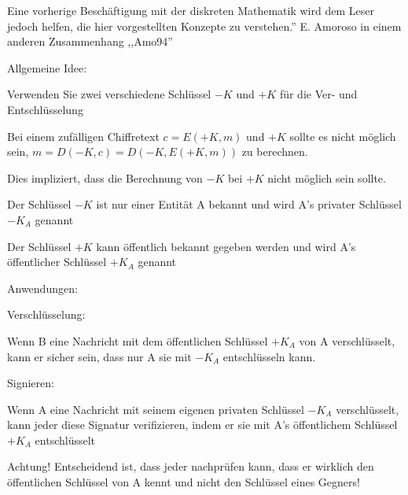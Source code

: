 \documentclass[a4paper]{article}
\begin{document}
\begin{multicols}{3}
      Eine vorherige Beschäftigung mit der diskreten Mathematik wird dem Leser
      jedoch helfen, die hier vorgestellten Konzepte zu verstehen.'' E.
      Amoroso in einem anderen Zusammenhang ,,Amo94''

      \begin{itemize*}
            \item Allgemeine Idee:
            \begin{itemize*}
                  \item Verwenden Sie zwei verschiedene Schlüssel $-K$ und $+K$ für die Ver- und Entschlüsselung
                  \item Bei einem zufälligen Chiffretext $c=E(+K, m)$ und $+K$ sollte es nicht möglich sein, $m = D(-K, c) = D(-K, E(+K, m))$ zu berechnen.
                  \begin{itemize*} \item Dies impliziert, dass die Berechnung von $-K$ bei $+K$ nicht möglich sein sollte. \end{itemize*}
                  \item Der Schlüssel $-K$ ist nur einer Entität A bekannt und wird A's privater Schlüssel $-K_A$ genannt
                  \item Der Schlüssel $+K$ kann öffentlich bekannt gegeben werden und wird A's öffentlicher Schlüssel $+K_A$ genannt
            \end{itemize*}
            \item Anwendungen:
            \begin{itemize*}
                  \item Verschlüsselung:
                  \begin{itemize*} \item Wenn B eine Nachricht mit dem öffentlichen Schlüssel $+K_A$ von A verschlüsselt, kann er sicher sein, dass nur A sie mit $-K_A$ entschlüsseln kann. \end{itemize*}
                  \item Signieren:
                  \begin{itemize*} \item Wenn A eine Nachricht mit seinem eigenen privaten Schlüssel $-K_A$ verschlüsselt, kann jeder diese Signatur verifizieren, indem er sie mit A's öffentlichem Schlüssel $+K_A$ entschlüsselt \end{itemize*}
                  \item Achtung! Entscheidend ist, dass jeder nachprüfen kann, dass er wirklich den öffentlichen Schlüssel von A kennt und nicht den Schlüssel eines Gegners!

\end{itemize*}
\end{itemize*}
\end{multicols}
\end{document}
